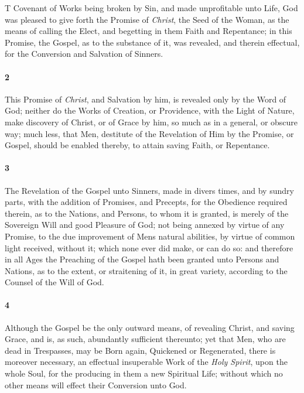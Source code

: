 \documentclass[
    paper=letterpaper,
    11pt,
    twoside,
    DIV=calc,
    openany
]{scrbook}
\makeatletter
\newcommand{\oldgrammar}[2]{#2}
\def\extractfirstletter#1#2@{#1}
\newcommand{\firstlettercommand}[1]{ \extractfirstletter#1@ }
\newcommand{\oldleadin}[2]{\lettrine[ante=\textbf{1},lines=2,lraise=0.1,findent=-0.3em,nindent=0.1em, slope=0em]{\color{red}\firstlettercommand{#2}}{\RemoveFirstLetter{#2}}}
\newcommand{\firstparagraph}{}
\makeatother
\begin{document}
\firstparagraph{} %
\oldleadin{THE}{The} Covenant of Works being broken by Sin, and made unprofitable unto Life, God was pleased to give forth the Promise of \textit{Christ}, \R{}the Seed of the Woman, as the means of calling the Elect, and begetting in them Faith and Repentance; in this Promise, the \R{}Gospel, as to the substance of it, was revealed, and therein effectual, for the Conversion and Salvation of Sinners.

\footnotebegin
{}
\footnoteend

\paragraph{2} %
This Promise of \textit{Christ}, and Salvation by him, is revealed only by \R{}the Word of God; neither do the Works of Creation, or Providence, with the Light of Nature, \R{}make discovery of Christ, or of Grace by him, so much as in a general, or obscure way; much less, that Men, destitute of the Revelation of Him by the Promise, or Gospel, \R{}should be enabled thereby, to attain saving Faith, or Repentance.

\footnotebegin
{}
\footnoteend

\paragraph{3} %
The Revelation of the Gospel unto Sinners, made in divers times, and by sundry parts, with the addition of Promises, and Precepts, for the Obedience required therein, as to the Nations, and Persons, to whom it is granted, is \oldgrammar{meerly}{merely} of the \R{}\oldgrammar{Soveraign}{Sovereign} Will and good Pleasure of God; not being annexed by \oldgrammar{vertue}{virtue} of any Promise, to the due improvement of Mens natural abilities, by \oldgrammar{vertue}{virtue} of common light received, without it; which none ever did \R{}make, or can do so: and therefore in all Ages the Preaching of the Gospel hath been granted unto Persons and Nations, as to the extent, or \oldgrammar{straitning}{straitening} of it, in great variety, according to the Counsel of the Will of God.

\footnotebegin
{}
\footnoteend

\paragraph{4} %
Although the Gospel be the only outward means, of revealing Christ, and saving Grace, and is, as such, abundantly sufficient thereunto; yet that Men, who are dead in Trespasses, may be Born again, Quickened or Regenerated, there is moreover necessary, an effectual insuperable \R{}Work of the \textit{Holy Spirit}, upon the whole Soul, for the producing in them a new Spiritual Life; without which no other means will effect \R{}their Conversion unto God.
\end{document}
